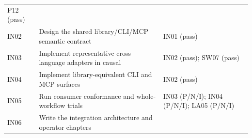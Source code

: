 \documentclass[
  11pt,
  a4paper,
]{article}
\begin{document}
\begin{longtable}[]{@{}lll@{}}
\begin{minipage}[t]{0.30\columnwidth}
P12 (pass)\strut
\end{minipage}\tabularnewline
\begin{minipage}[t]{0.30\columnwidth}\raggedright
IN02\strut
\end{minipage} & \begin{minipage}[t]{0.30\columnwidth}\raggedright
Design the shared library/CLI/MCP semantic contract\strut
\end{minipage} & \begin{minipage}[t]{0.30\columnwidth}\raggedright
IN01 (pass)\strut
\end{minipage}\tabularnewline
\begin{minipage}[t]{0.30\columnwidth}\raggedright
IN03\strut
\end{minipage} & \begin{minipage}[t]{0.30\columnwidth}\raggedright
Implement representative cross-language adapters in causal\strut
\end{minipage} & \begin{minipage}[t]{0.30\columnwidth}\raggedright
IN02 (pass); SW07 (pass)\strut
\end{minipage}\tabularnewline
\begin{minipage}[t]{0.30\columnwidth}\raggedright
IN04\strut
\end{minipage} & \begin{minipage}[t]{0.30\columnwidth}\raggedright
Implement library-equivalent CLI and MCP surfaces\strut
\end{minipage} & \begin{minipage}[t]{0.30\columnwidth}\raggedright
IN02 (pass)\strut
\end{minipage}\tabularnewline
\begin{minipage}[t]{0.30\columnwidth}\raggedright
IN05\strut
\end{minipage} & \begin{minipage}[t]{0.30\columnwidth}\raggedright
Run consumer conformance and whole-workflow trials\strut
\end{minipage} & \begin{minipage}[t]{0.30\columnwidth}\raggedright
IN03 (P/N/I); IN04 (P/N/I); LA05 (P/N/I)\strut
\end{minipage}\tabularnewline
\begin{minipage}[t]{0.30\columnwidth}\raggedright
IN06\strut
\end{minipage} & \begin{minipage}[t]{0.30\columnwidth}\raggedright
Write the integration architecture and operator chapters\strut

\end{minipage}
\end{longtable}
\end{document}
